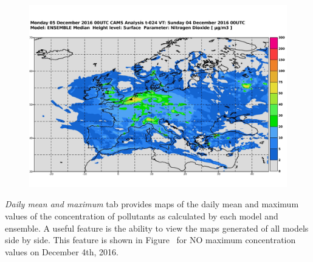 \documentclass[9pt]{report}
\begin{document}
\begin{figure}[h!]%
\begin{mdcenter}%

\noindent{}\includegraphics[keepaspectratio=true,width=\dimmin{}{\dimwidth{0.90}}]{images/ensemble_analysis_surface}{}%

\mdhr{}%

\noindent{}%
\end{mdcenter}\label{ensemble-maps}%
\end{figure}%

\noindent{}\emph{Daily mean and maximum} tab provides maps of the daily mean and maximum values of the concentration of pollutants as calculated by each model and ensemble.
A useful feature is the ability to view the maps generated of all models side by side. 
This feature is shown in Figure~ for NO maximum concentration values on December 4th, 2016.%
\end{document}
